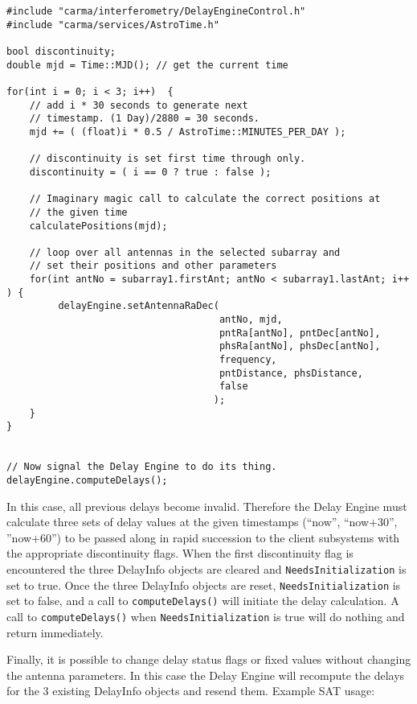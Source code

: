 \documentclass[preprint]{aastex}
\begin{document}
\begin{verbatim}
#include "carma/interferometry/DelayEngineControl.h"
#include "carma/services/AstroTime.h"

bool discontinuity;
double mjd = Time::MJD(); // get the current time

for(int i = 0; i < 3; i++)  {
    // add i * 30 seconds to generate next
    // timestamp. (1 Day)/2880 = 30 seconds.
    mjd += ( (float)i * 0.5 / AstroTime::MINUTES_PER_DAY );  

    // discontinuity is set first time through only.
    discontinuity = ( i == 0 ? true : false ); 

    // Imaginary magic call to calculate the correct positions at 
    // the given time
    calculatePositions(mjd);

    // loop over all antennas in the selected subarray and
    // set their positions and other parameters
    for(int antNo = subarray1.firstAnt; antNo < subarray1.lastAnt; i++ ) {
         delayEngine.setAntennaRaDec(
                                     antNo, mjd,
                                     pntRa[antNo], pntDec[antNo],
                                     phsRa[antNo], phsDec[antNo],
                                     frequency, 
                                     pntDistance, phsDistance, 
                                     false
                                    );
    }
}


// Now signal the Delay Engine to do its thing.
delayEngine.computeDelays();
\end{verbatim}


In this case, all previous delays become invalid.  Therefore the
Delay Engine must calculate three sets of delay values at the
given timestamps (``now'', ``now+30'', ''now+60'') to be passed
along in rapid succession to the client subsystems with the
appropriate discontinuity flags.  When the first discontinuity
flag is encountered the three DelayInfo objects are cleared and
{\tt NeedsInitialization} is set to true.  Once the three DelayInfo
objects are reset, {\tt NeedsInitialization} is set to false, and a
call to {\tt computeDelays()} will initiate the delay calculation.
A call to {\tt computeDelays()} when {\tt NeedsInitialization}
is true will do nothing and return immediately.

Finally, it is possible to change delay status flags or
fixed values without changing the antenna parameters. In
this case the Delay Engine will recompute the delays for
the 3 existing DelayInfo objects and resend them. Example SAT usage:
\end{document}
